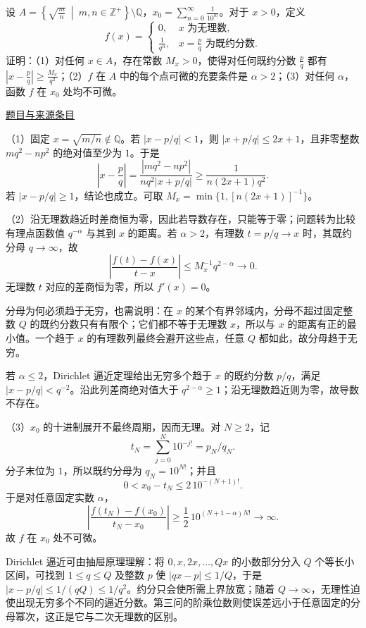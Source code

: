 \documentclass[UTF8,12pt,a4paper,fontset=fandol]{ctexart}
\begin{document}
\begin{example}[来源序号6]\label{ex:ch06-14th-A-makeup2:6}\label{pr:ch06-14th-A-makeup2:6}

设 $A=\left\{\sqrt{\frac{m}{n}}\ \middle|\ m,n\in\mathbb{Z}^{+}\right\}\setminus\mathbb{Q}$，$x_{0}=\sum_{n=0}^{\infty}\frac{1}{10^{n!}}$。对于 $x>0$，定义
\[
f(x)=\begin{cases}0, & x\text{ 为无理数},\\ \frac{1}{q^{\alpha}}, & x=\frac{p}{q}\text{ 为既约分数}.\end{cases}
\]
证明：（1）对任何 $x\in A$，存在常数 $M_{x}>0$，使得对任何既约分数 $\frac{p}{q}$ 都有 $\left|x-\frac{p}{q}\right|\geq\frac{M_{x}}{q^{2}}$；（2）$f$ 在 $A$ 中的每个点可微的充要条件是 $\alpha>2$；（3）对任何 $\alpha$，函数 $f$ 在 $x_{0}$ 处均不可微。

\par\href{https://github.com/lzxcr/cmc-mathematics/blob/64916fa1fdbc3e444a652eca204d5669058ee321/src/problems/preliminary/14-makeup2/06.md}{题目与来源条目}

\end{example}

\begin{solve}\label{ans:ch06-14th-A-makeup2:6}

（1）固定 $x=\sqrt{m/n}\notin\mathbb Q$。若 $|x-p/q|<1$，则 $|x+p/q|\leq2x+1$，且非零整数 $mq^2-np^2$ 的绝对值至少为 $1$。于是
\[
\left|x-\frac pq\right|
=\frac{|mq^2-np^2|}{nq^2|x+p/q|}
\geq\frac1{n(2x+1)q^2}.
\]
若 $|x-p/q|\geq1$，结论也成立。可取 $M_x=\min\{1,[n(2x+1)]^{-1}\}$。

（2）沿无理数趋近时差商恒为零，因此若导数存在，只能等于零；问题转为比较有理点函数值 $q^{-\alpha}$ 与其到 $x$ 的距离。若 $\alpha>2$，有理数 $t=p/q\to x$ 时，其既约分母 $q\to\infty$，故
\[
\left|\frac{f(t)-f(x)}{t-x}\right|
\leq M_x^{-1}q^{2-\alpha}\longrightarrow0.
\]
无理数 $t$ 对应的差商恒为零，所以 $f'(x)=0$。

分母为何必须趋于无穷，也需说明：在 $x$ 的某个有界邻域内，分母不超过固定整数 $Q$ 的既约分数只有有限个；它们都不等于无理数 $x$，所以与 $x$ 的距离有正的最小值。一个趋于 $x$ 的有理数列最终会避开这些点，任意 $Q$ 都如此，故分母趋于无穷。

若 $\alpha\leq2$，Dirichlet 逼近定理给出无穷多个趋于 $x$ 的既约分数 $p/q$，满足 $|x-p/q|<q^{-2}$。沿此列差商绝对值大于 $q^{2-\alpha}\geq1$；沿无理数趋近则为零，故导数不存在。

（3）$x_0$ 的十进制展开不最终周期，因而无理。对 $N\geq2$，记
\[
t_N=\sum_{j=0}^N10^{-j!}=p_N/q_N.
\]
分子末位为 $1$，所以既约分母为 $q_N=10^{N!}$；并且
\[
0<x_0-t_N\leq2\,10^{-(N+1)!}.
\]
于是对任意固定实数 $\alpha$，
\[
\left|\frac{f(t_N)-f(x_0)}{t_N-x_0}\right|
\geq\frac12\,10^{(N+1-\alpha)N!}\longrightarrow\infty.
\]
故 $f$ 在 $x_0$ 处不可微。

Dirichlet 逼近可由抽屉原理理解：将 $0,x,2x,\ldots,Qx$ 的小数部分分入 $Q$ 个等长小区间，可找到 $1\le q\le Q$ 及整数 $p$ 使 $|qx-p|\le1/Q$，于是 $|x-p/q|\le1/(qQ)\le1/q^2$。约分只会使所需上界放宽；随着 $Q\to\infty$，无理性迫使出现无穷多个不同的逼近分数。第三问的阶乘位数则使误差远小于任意固定的分母幂次，这正是它与二次无理数的区别。

\end{solve}
\end{document}
